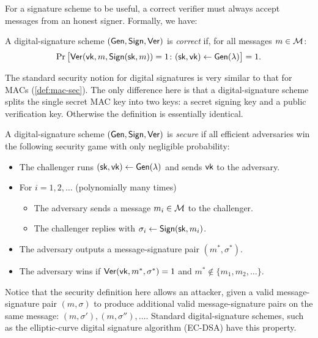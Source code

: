 For a signature scheme to be useful, a correct verifier must always accept messages from an
honest signer. Formally, we have:

\begin{definition}
  A digital-signature scheme $(\mathsf{Gen}, \mathsf{Sign}, \mathsf{Ver})$ is \emph{correct} if,
  for all messages $m \in \mathcal{M}$:
  \[ \Pr\big[\mathsf{Ver}(\mathsf{vk}, m, \mathsf{Sign}({\mathsf{sk}}, m)) = 1 \colon ({\mathsf{sk}}, \mathsf{vk}) \gets \mathsf{Gen}(\lambda) \big] = 1. \]
\end{definition}

The standard security notion for digital signatures is very similar
to that for MACs (\cref{def:mac-sec}).
The only difference here is that a digital-signature scheme splits the single
secret MAC key into two keys: a secret signing key and a public verification key.
Otherwise the definition is essentially identical.

\begin{definition}\label{def:sig-sec}
  A digital-signature scheme $(\mathsf{Gen}, \mathsf{Sign}, \mathsf{Ver})$ is \emph{secure} if
  all efficient adversaries win the following security 
  game with only negligible probability:
  \begin{itemize}[noitemsep]
    \item The challenger runs $({\mathsf{sk}}, \mathsf{vk}) \gets \mathsf{Gen}(\lambda)$ and sends $\mathsf{vk}$ to the adversary.
    \item For $i = 1, 2, \dots$  (polynomially many times)
      \begin{itemize}
        \item The adversary sends a message $m_i \in \mathcal{M}$ to the challenger.
        \item The challenger replies with $\sigma_i \gets \mathsf{Sign}({\mathsf{sk}}, m_i)$.
      \end{itemize}
    \item The adversary outputs a message-signature pair $(m^*, \sigma^*)$.
    \item The adversary wins if $\mathsf{Ver}(\mathsf{vk}, m^*, \sigma^*) = 1$ and $m^* \not \in \{m_1, m_2, \dots\}$.
  \end{itemize}
\end{definition}

Notice that the security definition here allows an attacker, given a valid
message-signature pair $(m, \sigma)$ to produce additional valid message-signature
pairs on the same message: $(m, \sigma'), (m, \sigma''), \dots$.
Standard digital-signature schemes, such as the elliptic-curve digital signature
algorithm (EC-DSA) have this property.

